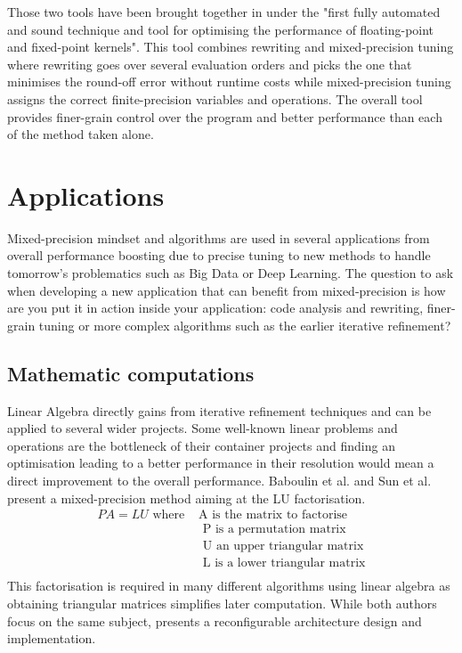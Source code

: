 Those two tools have been brought together in \cite{Darulova2018} under the "first fully automated and sound technique and tool for optimising the performance of floating-point and fixed-point kernels". This tool combines rewriting and mixed-precision tuning where rewriting goes over several evaluation orders and picks the one that minimises the round-off error without runtime costs while mixed-precision tuning assigns the correct finite-precision variables and operations. The overall tool provides finer-grain control over the program and better performance than each of the method taken alone.


\section{Applications}

Mixed-precision mindset and algorithms are used in several applications from overall performance boosting due to precise tuning to new methods to handle tomorrow's problematics such as Big Data or Deep Learning. The question to ask when developing a new application that can benefit from mixed-precision is how are you put it in action inside your application: code analysis and rewriting, finer-grain tuning or more complex algorithms such as the earlier iterative refinement?


\subsection{Mathematic computations}

Linear Algebra directly gains from iterative refinement techniques and can be applied to several wider projects. Some well-known linear problems and operations are the bottleneck of their container projects and finding an optimisation leading to a better performance in their resolution would mean a direct improvement to the overall performance. Baboulin et al. \cite{Baboulin2009} and Sun et al. \cite{Sun2008} present a mixed-precision method aiming at the LU factorisation.
\begin{align}
  PA=LU \textrm{ where } & \textrm{A is the matrix to factorise} \\
        & \textrm{ P is a permutation matrix} \\
        & \textrm{ U an upper triangular matrix} \\
        & \textrm{ L is a lower triangular matrix} \\
\end{align}
This factorisation is required in many different algorithms using linear algebra as obtaining triangular matrices simplifies later computation. While both authors focus on the same subject, \cite{Sun2008} presents a reconfigurable architecture design and implementation.

